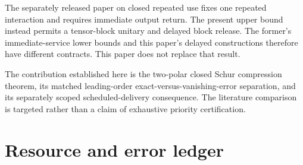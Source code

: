 \documentclass[11pt,a4paper]{article}
\numberwithin{equation}{section}
\begin{document}
The separately released paper on closed repeated use \citep{douglas2026}
fixes one repeated interaction and requires immediate output return. The
present upper bound instead permits a tensor-block unitary and delayed
block release. The former's immediate-service lower bounds and this
paper's delayed constructions therefore have different contracts. This
paper does not replace that result.

The contribution established here is the two-polar closed Schur
compression theorem, its matched leading-order
exact-versus-vanishing-error separation, and its separately scoped
scheduled-delivery consequence. The literature comparison is targeted
rather than a claim of exhaustive priority certification.

\clearpage

\section{Resource and error ledger}\label{resource-and-error-ledger}
\end{document}
